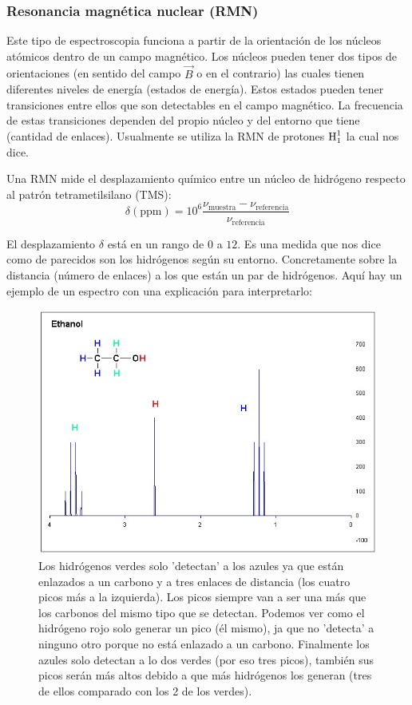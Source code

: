 \documentclass[arial,a4paper,print]{article}
\begin{document}
\subsubsection{Resonancia magnética nuclear (RMN)}

Este tipo de espectroscopia funciona a partir de la orientación de los núcleos atómicos dentro de un campo magnético. Los núcleos pueden tener dos tipos de orientaciones (en sentido del campo $\vec{B}$ o en el contrario) las cuales tienen diferentes niveles de energía (estados de energía). Estos estados pueden tener transiciones entre ellos que son detectables en el campo magnético. La frecuencia de estas transiciones dependen del propio núcleo y del entorno que tiene (cantidad de enlaces). Usualmente se utiliza la RMN de protones $ \ce{H^{1}_{1}} $ la cual nos dice. 

Una RMN mide el desplazamiento químico entre un núcleo de hidrógeno respecto al patrón tetrametilsilano (TMS): 
\begin{equation*}
	\delta(\text{ppm}) = 10^{6}\frac{\nu_{\text{muestra}} - \nu_{\text{referencia}} }{\nu_{\text{referencia}} }
\end{equation*}

El desplazamiento $\delta$ está en un rango de $0$ a $12$. Es una medida que nos dice como de parecidos son los hidrógenos según su entorno. Concretamente sobre la distancia (número de enlaces) a los que están un par de hidrógenos. Aquí hay un ejemplo de un espectro con una explicación para interpretarlo:
\begin{figure}[H]
	\centering
	\includegraphics[width=0.5\linewidth]{figures/RMN}
	\caption{Los hidrógenos verdes solo 'detectan' a los azules ya que están enlazados a un carbono y a tres enlaces de distancia (los cuatro picos más a la izquierda). Los picos siempre van a ser una más que los carbonos del mismo tipo que se detectan. Podemos ver como el hidrógeno rojo solo generar un pico (él mismo), ja que no 'detecta' a ninguno otro porque no está enlazado a un carbono. Finalmente los azules solo detectan a lo dos verdes (por eso tres picos), también sus picos serán más altos debido a que más hidrógenos los generan (tres de ellos comparado con los 2 de los verdes).}
	\label{fig:rmn}
\end{figure}
\end{document}
